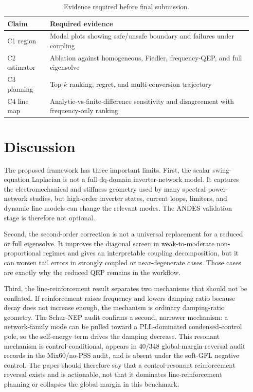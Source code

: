 \documentclass[journal]{IEEEtran}
\begin{document}
\begin{table}[t]
\centering
\caption{Evidence required before final submission.}
\label{tab:evidence}
\begin{tabular}{p{}p{}}
\toprule
Claim & Required evidence\\
\midrule
C1 region & Modal plots showing safe/unsafe boundary and failures under coupling\\
C2 estimator & Ablation against homogeneous, Fiedler, frequency-QEP, and full eigensolve\\
C3 planning & Top-$k$ ranking, regret, and multi-conversion trajectory\\
C4 line map & Analytic-vs-finite-difference sensitivity and disagreement with frequency-only ranking\\
\bottomrule
\end{tabular}
\end{table}

\section{Discussion}

The proposed framework has three important limits. First, the scalar swing-equation Laplacian is not a full dq-domain inverter-network model. It captures the electromechanical and stiffness geometry used by many spectral power-network studies, but high-order inverter states, current loops, limiters, and dynamic line models can change the relevant modes. The ANDES validation stage is therefore not optional.

Second, the second-order correction is not a universal replacement for a reduced or full eigensolve. It improves the diagonal screen in weak-to-moderate non-proportional regimes and gives an interpretable coupling decomposition, but it can worsen tail errors in strongly coupled or near-degenerate cases. Those cases are exactly why the reduced QEP remains in the workflow.

Third, the line-reinforcement result separates two mechanisms that should not be conflated. If reinforcement raises frequency and lowers damping ratio because decay does not increase enough, the mechanism is ordinary damping-ratio geometry. The Schur-NEP audit confirms a second, narrower mechanism: a network-family mode can be pulled toward a PLL-dominated condensed-control pole, so the self-energy term drives the damping decrease. This resonant mechanism is control-conditional, appears in $40/348$ global-margin-reversal audit records in the Mix60/no-PSS audit, and is absent under the soft-GFL negative control. The paper should therefore say that a control-resonant reinforcement reversal exists and is actionable, not that it dominates line-reinforcement planning or collapses the global margin in this benchmark.
\end{document}
